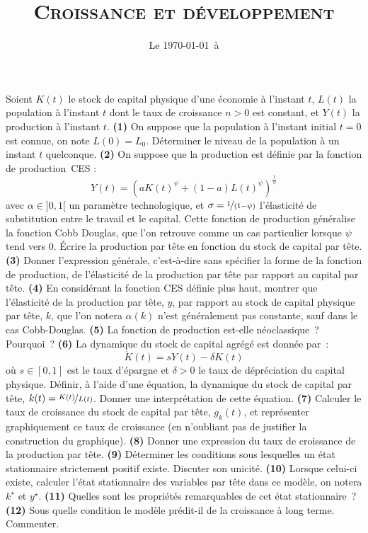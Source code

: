 \documentclass[11pt,a4paper,notitlepage,twocolumn]{article}
\begin{document}
\title{\textsc{Croissance et développement}}
\date{Le \today\ à \thistime}

\maketitle
\thispagestyle{empty}

Soient $K(t)$ le stock de capital physique d'une économie à l'instant $t$,
$L(t)$ la population à l'instant $t$ dont le taux de croissance $n>0$ est
constant, et $Y(t)$ la production à l'instant $t$. \textbf{(1)} On suppose que
la population à l'instant initial $t=0$ est connue, on note $L(0) = L_0$.
Déterminer le niveau de la population à un instant $t$ quelconque. \textbf{(2)}
On suppose que la production est définie par la fonction de production CES :
\[
Y(t) = \left(aK(t)^{\psi} + (1-a)L(t)^{\psi}\right)^{\frac{1}{\psi}}
\]
avec $\alpha\in]0,1[$ un paramètre technologique, et
$\sigma=\nicefrac{1}{(1-\psi)}$ l'élasticité de substitution entre le travail et
le capital. Cette fonction de production généralise la fonction Cobb Douglas,
que l'on retrouve comme un cas particulier lorsque $\psi$ tend vers $0$. Écrire
la production par tête en fonction du stock de capital par tête. \textbf{(3)}
Donner l'expression générale, c'est-à-dire sans spécifier la forme de la
fonction de production, de l'élasticité de la production par tête par rapport au
capital par tête. \textbf{(4)} En considérant la fonction CES définie plus haut,
montrer que l'élasticité de la production par tête, $y$, par rapport au stock de
capital physique par tête, $k$, que l'on notera $\alpha(k)$ n'est généralement
pas constante, sauf dans le cas Cobb-Douglas. \textbf{(5)} La fonction de
production est-elle néoclassique ? Pourquoi ? \textbf{(6)} La dynamique du stock
de capital agrégé est donnée par :
\[
\dot K(t) = sY(t)-\delta K(t)
\]
où $s\in[0,1]$ est le taux d'épargne et $\delta>0$ le taux de dépréciation du
capital physique. Définir, à l'aide d'une équation, la dynamique du stock de
capital par tête, $k(t)=\nicefrac{K(t)}{L(t)}$. Donner une interprétation de
cette équation. \textbf{(7)} Calculer le taux de croissance du stock de capital
par tête, $g_k(t)$, et représenter graphiquement ce taux de croissance (en
n'oubliant pas de justifier la construction du graphique). \textbf{(8)} Donner
une expression du taux de croissance de la production par tête. \textbf{(9)}
Déterminer les conditions sous lesquelles un état stationnaire strictement
positif existe. Discuter son unicité. \textbf{(10)} Lorsque celui-ci existe,
calculer l'état stationnaire des variables par tête dans ce modèle, on notera
$k^{\star}$ et $y^{\star}$. \textbf{(11)} Quelles sont les propriétés
remarquables de cet état stationnaire ? \textbf{(12)} Sous quelle condition le
modèle prédit-il de la croissance à long terme. Commenter.
\end{document}

